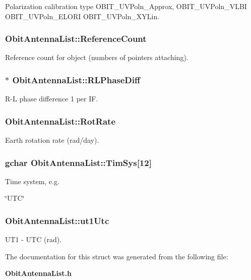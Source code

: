 Polarization calibration type OBIT\_\-UVPoln\_\-Approx, OBIT\_\-UVPoln\_\-VLBI OBIT\_\-UVPoln\_\-ELORI OBIT\_\-UVPoln\_\-XYLin. 

\subsubsection{ {\bf Obit\-Antenna\-List::Reference\-Count}}\label{structObitAntennaList_o2}


Reference count for object (numbers of pointers attaching). 

\subsubsection{$\ast$ {\bf Obit\-Antenna\-List::RLPhase\-Diff}}\label{structObitAntennaList_o15}


R-L phase difference 1 per IF. 

\subsubsection{ {\bf Obit\-Antenna\-List::Rot\-Rate}}\label{structObitAntennaList_o9}


Earth rotation rate (rad/day). 

\subsubsection{\setlength{\rightskip}{0pt plus 5cm}gchar {\bf Obit\-Antenna\-List::Tim\-Sys}[12]}\label{structObitAntennaList_o21}


Time system, e.g. 

\char`\"{}UTC\char`\"{} 
\subsubsection{ {\bf Obit\-Antenna\-List::ut1Utc}}\label{structObitAntennaList_o12}


UT1 - UTC (rad). 



The documentation for this struct was generated from the following file:\begin{CompactItemize}
\item 
{\bf Obit\-Antenna\-List.h}\end{CompactItemize}
